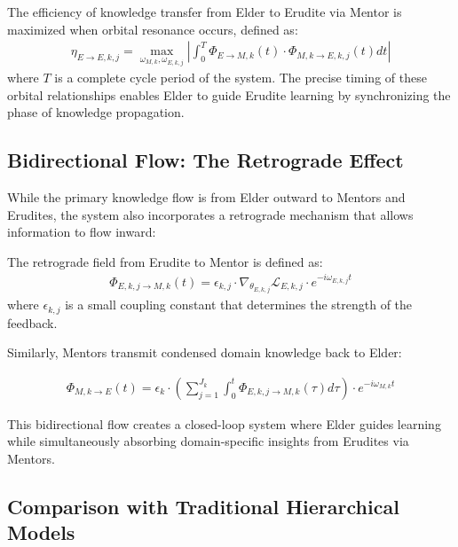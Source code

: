 \begin{theorem}
The efficiency of knowledge transfer from Elder to Erudite via Mentor is maximized when orbital resonance occurs, defined as:
\begin{align}
\eta_{E \rightarrow E,k,j} = \max_{\omega_{M,k}, \omega_{E,k,j}} \left| \int_0^T \Phi_{E \rightarrow M,k}(t) \cdot \Phi_{M,k \rightarrow E,k,j}(t) dt \right|
\end{align}
where $T$ is a complete cycle period of the system. The precise timing of these orbital relationships enables Elder to guide Erudite learning by synchronizing the phase of knowledge propagation.
\end{theorem}

\subsection{Bidirectional Flow: The Retrograde Effect}

While the primary knowledge flow is from Elder outward to Mentors and Erudites, the system also incorporates a retrograde mechanism that allows information to flow inward:

\begin{definition}
The retrograde field from Erudite to Mentor is defined as:
\begin{align}
\Phi_{E,k,j \rightarrow M,k}(t) = \epsilon_{k,j} \cdot \nabla_{\theta_{E,k,j}}\mathcal{L}_{E,k,j} \cdot e^{-i\omega_{E,k,j}t}
\end{align}
where $\epsilon_{k,j}$ is a small coupling constant that determines the strength of the feedback.
\end{definition}

Similarly, Mentors transmit condensed domain knowledge back to Elder:

\begin{align}
\Phi_{M,k \rightarrow E}(t) = \epsilon_k \cdot \left(\sum_{j=1}^{J_k} \int_0^t \Phi_{E,k,j \rightarrow M,k}(\tau) d\tau\right) \cdot e^{-i\omega_{M,k}t}
\end{align}

This bidirectional flow creates a closed-loop system where Elder guides learning while simultaneously absorbing domain-specific insights from Erudites via Mentors.

\subsection{Comparison with Traditional Hierarchical Models}

